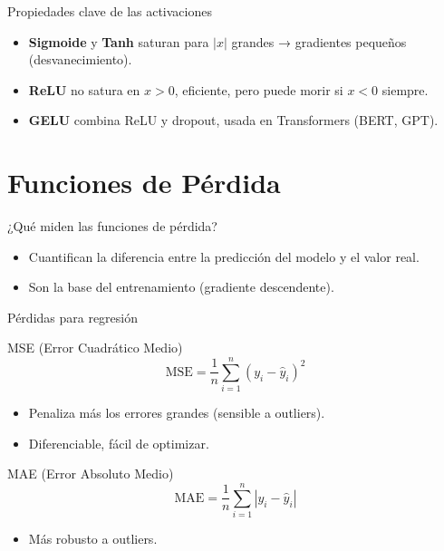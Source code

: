 \documentclass[aspectratio=169, 10pt, xcolor=table]{beamer}
\begin{document}
\begin{frame}{Propiedades clave de las activaciones}
    \begin{itemize}
        \item \textbf{Sigmoide} y \textbf{Tanh} saturan para $|x|$ grandes → gradientes pequeños (desvanecimiento).
        \item \textbf{ReLU} no satura en $x>0$, eficiente, pero puede morir si $x<0$ siempre.
        \item \textbf{GELU} combina ReLU y dropout, usada en Transformers (BERT, GPT).
    \end{itemize}
\end{frame}

\section{Funciones de Pérdida}

\begin{frame}{¿Qué miden las funciones de pérdida?}
    \begin{itemize}
        \item Cuantifican la diferencia entre la predicción del modelo y el valor real.
        \item Son la base del entrenamiento (gradiente descendente).
    \end{itemize}
\end{frame}

\begin{frame}{Pérdidas para regresión}
    \begin{block}{MSE (Error Cuadrático Medio)}
        \[
        \text{MSE} = \frac{1}{n}\sum_{i=1}^{n}(y_i - \hat{y}_i)^2
        \]
        \begin{itemize}
            \item Penaliza más los errores grandes (sensible a outliers).
            \item Diferenciable, fácil de optimizar.
        \end{itemize}
    \end{block}
    \begin{block}{MAE (Error Absoluto Medio)}
        \[
        \text{MAE} = \frac{1}{n}\sum_{i=1}^{n}|y_i - \hat{y}_i|
        \]
        \begin{itemize}
            \item Más robusto a outliers.
        \end{itemize}
    \end{block}
\end{frame}
\end{document}
